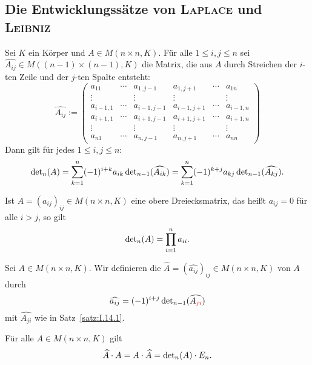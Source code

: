\subsection{Die Entwicklungssätze von \textsc{Laplace} und \textsc{Leibniz}}

\begin{satz}
	\label{satz:I.14.1}
	Sei $K$ ein Körper und $A \in M(n \times n,K)$.
	Für alle $1 \leq i,j \leq n$ sei $\widehat{A_{ij}} \in M((n-1)\times(n-1),K)$ die Matrix, die aus $A$ durch Streichen der $i$-ten Zeile und der $j$-ten Spalte entsteht: 
	\[
		\widehat{A_{ij}} := \begin{pmatrix}
		a_11 & \cdots & a_{1,j-1} & a_{1,j+1} & \cdots & a_{1n} \\ 
		\vdots &  & \vdots & \vdots &  & \vdots \\ 
		a_{i-1,1} & \cdots & a_{i-1,j-1} & a_{i-1,j+1} & \cdots & a_{i-1,n} \\ 
		a_{i+1,1} & \cdots & a_{i+1,j-1} & a_{i+1,j+1} & \cdots & a_{i+1,n} \\ 
		\vdots &  & \vdots & \vdots &  & \vdots \\ 
		a_{n1} & \cdots & a_{n,j-1} & a_{n,j+1} & \cdots & a_{nn}
		\end{pmatrix} 
	\]
	Dann gilt für jedes $1 \leq i,j \leq n$:
	\[
		\operatorname{\det\,\!}_n(A) = \sum_{k=1}^{n} (-1)^{i+k} a_{ik} \operatorname{\det\,\!}_{n-1}(\widehat{A_{ik}}) = \sum_{k=1}^{n} (-1)^{k+j} a_{kj} \operatorname{\det\,\!}_{n-1}(\widehat{A_{kj}}).
	\]
\end{satz}

\setcounter{satz}{3}
\begin{korollar}
	\label{kor:I.14.4}
	Ist $A = (a_{ij})_{ij} \in M(n \times n,K)$ eine obere Dreiecksmatrix, das heißt $a_{ij} = 0$ für alle $i > j$, so gilt
	\[
		\operatorname{\det\,\!}_n(A) = \prod_{i=1}^{n} a_{ii}.
	\]
\end{korollar}

\begin{definition}[Adjunkte]
	\label{def:I.14.5}
	Sei $A \in M(n \times n,K)$. Wir definieren die  $\widehat{A} = (\widehat{a_{ij}})_{ij} \in M(n \times n,K)$ von $A$ durch
	\[
		\widehat{a_{ij}} = (-1)^{i+j} \operatorname{\det\,\!}_{n-1}(\widehat{A_{\textcolor{red}{ji}}})
	\]
	mit $\widehat{A_{ji}}$ wie in Satz~\ref{satz:I.14.1}.
\end{definition}

\begin{satz}
	\label{satz:I.14.6}
	Für alle $A \in M(n \times n,K)$ gilt
	\[
		\widehat{A} \cdot A = A  \cdot \widehat{A} = \operatorname{\det\,\!}_n(A) \cdot E_n.
	\]
\end{satz}

